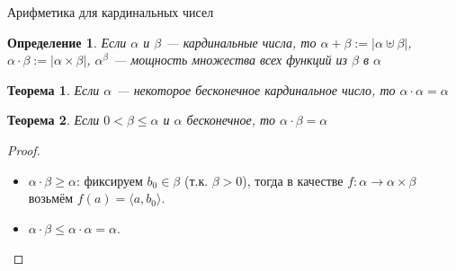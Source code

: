 \documentclass[aspectratio=169]{beamer}
\newtheorem{thm}{Теорема}[section]
\newtheorem{dfn}{Определение}[section]
\begin{document}


\begin{frame}{Арифметика для кардинальных чисел}
\begin{dfn}Если $\alpha$ и $\beta$ --- кардинальные числа, то 
$\alpha + \beta := |\alpha\uplus\beta|$,
$\alpha \cdot \beta := |\alpha \times \beta|$, 
$\alpha ^\beta$ --- мощность множества всех функций из $\beta$ в $\alpha$\end{dfn}

\begin{thm}Если $\alpha$ --- некоторое бесконечное кардинальное число, то $\alpha\cdot\alpha = \alpha$\end{thm}

\begin{thm}Если $0 < \beta \le \alpha$ и $\alpha$ бесконечное, то $\alpha\cdot\beta = \alpha$\end{thm}
\begin{proof}
\begin{itemize}
\item $\alpha \cdot \beta \ge \alpha$:
фиксируем $b_0 \in \beta$ (т.к. $\beta > 0$), тогда
в качестве $f : \alpha \rightarrow \alpha \times \beta$ возьмём $f(a) = \langle a,b_0\rangle$.
\item $\alpha \cdot \beta \le \alpha \cdot \alpha = \alpha$.
\end{itemize}
\end{proof}\vspace{0.5cm}
\end{frame}
\end{document}
